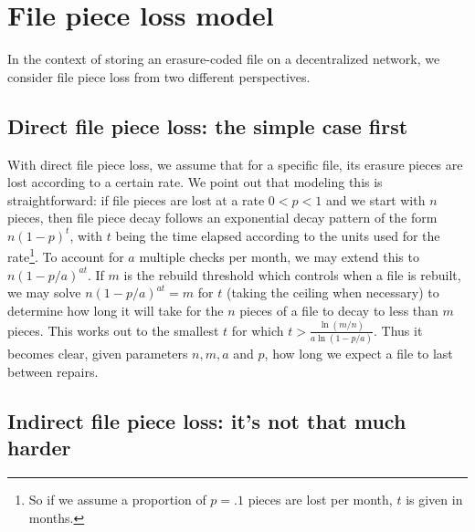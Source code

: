 \section{File piece loss model}
\label{appendix:RS}
\linespread{2.0}

In the context of storing an erasure-coded file on a decentralized network, we consider file piece loss from two different perspectives.

\subsection{Direct file piece loss: the simple case first}
With direct file piece loss, we assume that for a specific file, its erasure pieces are lost according to a certain rate. We point out that modeling this is straightforward: if file pieces are lost at a rate $0<p<1$ and we start with $n$ pieces, then file piece decay follows an exponential decay pattern of the form $n(1-p)^t$, with $t$ being the time elapsed according to the units used for the rate\footnote{So if we assume a proportion of $p=.1$ pieces are lost per month, $t$ is given in months.}. 
To account for $a$ multiple checks per month, we may extend this to $n(1-p/a)^{at}$. If $m$ is the rebuild threshold which controls when a file is rebuilt, we may solve $n(1-p/a)^{at}=m$ for $t$ (taking the ceiling when necessary) to determine how long it will take for the $n$ pieces of a file to decay to less than $m$ pieces. This works out to the smallest $t$ for which
$t>\frac{\ln(m/n)}{a\ln(1-p/a)}$. Thus it becomes clear, given parameters $n,m,a$ and $p$, how long we expect a file to last between repairs.

\subsection{Indirect file piece loss: it's not that much harder}

